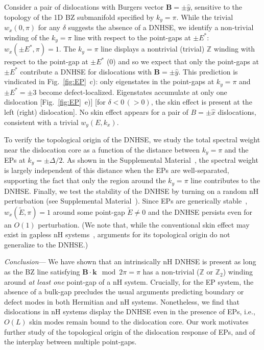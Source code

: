 \documentclass[aps,prl,twocolumn,amsmath,amssymb,floatfix,superscriptaddress]{revtex4-2}
\newcommand{\bs}[1]{\boldsymbol{#1}}
\begin{document}
Consider a pair of dislocations with Burgers vector $\bs{B} = \pm \hat{y}$, sensitive to the topology of the 1D BZ submanifold specified by $k_y = \pi$. While the trivial $w_x(0,\pi)$ for any $\delta$ suggests the absence of a DNHSE, we identify a non-trivial winding of the $k_y = \pi$ line with respect to the point-gaps at $\pm E^*$: $w_x(\pm E^*, \pi) = 1$. The $k_y = \pi$ line displays a nontrivial (trivial) $\mathbb{Z}$ winding with respect to the point-gap at $\pm E^*$ ($0$) and so we expect that only the point-gaps at $\pm E^*$ contribute a DNHSE for dislocations with $\bs{B} = \pm \hat{y}$. This prediction is vindicated in Fig.~\ref{fig:EP}~c): only eigenstates in the point-gaps at $k_y = \pi$ and $\pm E^*=\pm 3$ become defect-localized. Eigenstates accumulate at only one dislocation [Fig.~\ref{fig:EP}~e)] [for $\delta < 0\,(> 0)$, the skin effect is present at the left (right) dislocation]. No skin effect appears for a pair of $B = \pm \hat{x}$ dislocations, consistent with a trivial $w_y(E,k_x)$.

To verify the topological origin of the DNHSE, we study the total spectral weight near the dislocation core as a function of the distance between $k_y = \pi$ and the EPs at $k_y = \pm\Delta/2$. As shown in the Supplemental Material~\cite{Note3}, the spectral weight is largely independent of this distance when the EPs are well-separated, supporting the fact that only the region around the $k_y = \pi$ line contributes to the DNHSE. 
Finally, we test the stability of the DNHSE by turning on a random nH perturbation (see Supplemental Material~\cite{Note3}). Since EPs are generically stable~\cite{kawabata2019semi}, $w_x(\tilde{E},\pi) = 1$ around some point-gap $\tilde{E} \neq 0$ and the DNHSE persists even for an $O(1)$ perturbation. (We note that, while the conventional skin effect may exist in gapless nH systems~\cite{zhang2021universal}, arguments for its topological origin do not generalize to the DNHSE.)

\emph{Conclusion}---
We have shown that an intrinsically nH DNHSE is present as long as the BZ line satisfying $\bs{B} \cdot \bs{k} \mod 2\pi = \pi$ has a non-trivial ($\mathbb{Z}$ or $\mathbb{Z}_2$) winding around \textit{at least one} point-gap of a nH system. Crucially, for the EP system, the absence of a bulk-gap precludes the usual arguments predicting boundary or defect modes in both Hermitian and nH systems. Nonetheless, we find that dislocations in nH systems display the DNHSE even in the presence of EPs, i.e., $O(L)$ skin modes remain bound to the dislocation core. Our work motivates further study of the topological origin of the dislocation response of EPs, and of the interplay between multiple point-gaps.
\end{document}
